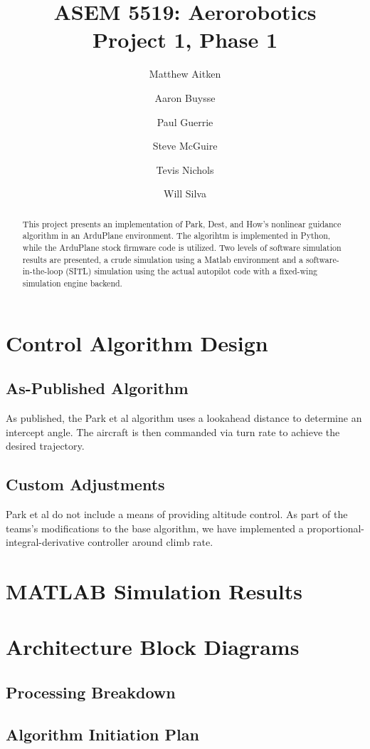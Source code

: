 \documentclass{aiaa}
\title{ASEM 5519: Aerorobotics \\ Project 1, Phase 1}
\author{Matthew Aitken \and Aaron Buysse \and Paul Guerrie \and Steve McGuire
\and Tevis Nichols \and Will Silva}
\begin{document}
\maketitle
\begin{abstract}
This project presents an implementation of Park, Dest, and How's nonlinear guidance algorithm in an ArduPlane environment. The algorihtm is implemented in Python, while the ArduPlane stock firmware code is utilized. Two levels of software simulation results are presented, a crude simulation using a Matlab environment and a software-in-the-loop (SITL) simulation using the actual autopilot code with a fixed-wing simulation engine backend.
\end{abstract}

\section{Control Algorithm Design}
\subsection{As-Published Algorithm}
As published, the Park et al algorithm uses a lookahead distance to determine an intercept angle. The aircraft is then commanded via turn rate to achieve the desired trajectory.
\subsection{Custom Adjustments}
Park et al do not include a means of providing altitude control. As part of the teams's modifications to the base algorithm, we have implemented a proportional-integral-derivative controller around climb rate.  
\section{MATLAB Simulation Results}
\section{Architecture Block Diagrams}
\subsection{Processing Breakdown}
\subsection{Algorithm Initiation Plan}
\end{document}
